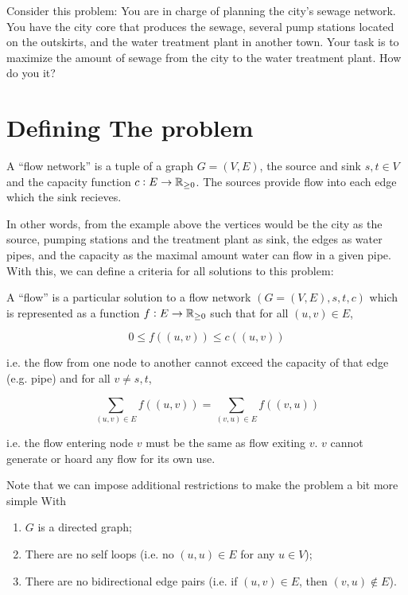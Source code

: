 Consider this problem: You are in charge of planning the city's sewage network. 
You have the city core that produces the sewage, several pump stations located on the outskirts, and the water treatment plant in another town. 
Your task is to maximize the amount of sewage from the city to the water treatment plant.
How do you it?

\section{Defining The problem}

\begin{define}
    A ``flow network'' is a tuple of a graph $G=(V,E)$, the source and sink $s,t\in V$ and the capacity function $c: E\to\mathbb{{R}}_{\ge 0}$. 
    The sources provide flow into each edge which the sink recieves.
\end{define}

In other words, from the example above the vertices would be the city as the source, pumping stations and the treatment plant as sink, the edges as water pipes, and the capacity as the maximal amount water can flow in a given pipe. 
With this, we can define a criteria for all solutions to this problem:

\begin{define}
    \label{ch3:flow-def}
    A ``flow'' is a particular solution to a flow network $(G=(V,E),s,t,c)$ which is represented as a function $f: E \to \mathbb{{R}}_{\ge 0}$ such that for all $(u,v)\in E$, 

    \begin{equation}
        0 \le f((u,v)) \le c((u,v))
    \end{equation}

    i.e. the flow from one node to another cannot exceed the capacity of that edge (e.g. pipe)
    and for all $v \neq s, t$, 

    \begin{equation}
        \sum_{(u,v) \in E} f((u,v)) = \sum_{(v,u) \in E} f((v,u))
    \end{equation}

    i.e. the flow entering node $v$ must be the same as flow exiting $v$.
    $v$ cannot generate or hoard any flow for its own use. 
\end{define}

Note that we can impose additional restrictions to make the problem a bit more simple With

\begin{enumerate}
    \item $G$ is a directed graph;
    \item There are no self loops (i.e. no $(u,u)\in E$ for any $u\in V$); 
    \item There are no bidirectional edge pairs (i.e. if $(u,v)\in E$, then $(v,u) \notin E$).
\end{enumerate}

